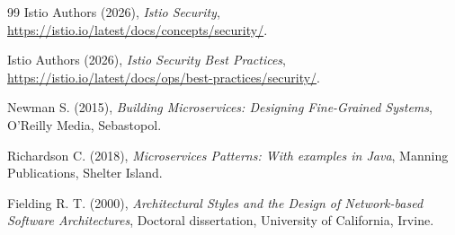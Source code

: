 \documentclass[14pt,a4paper]{extreport}
\begin{document}
\begin{thebibliography}{99}
Istio Authors (2026), \textit{Istio Security}, \url{https://istio.io/latest/docs/concepts/security/}.

Istio Authors (2026), \textit{Istio Security Best Practices}, \url{https://istio.io/latest/docs/ops/best-practices/security/}.

Newman S. (2015), \textit{Building Microservices: Designing Fine-Grained Systems}, O'Reilly Media, Sebastopol.

Richardson C. (2018), \textit{Microservices Patterns: With examples in Java}, Manning Publications, Shelter Island.

Fielding R. T. (2000), \textit{Architectural Styles and the Design of Network-based Software Architectures}, Doctoral dissertation, University of California, Irvine.

\end{thebibliography}
\end{document}
